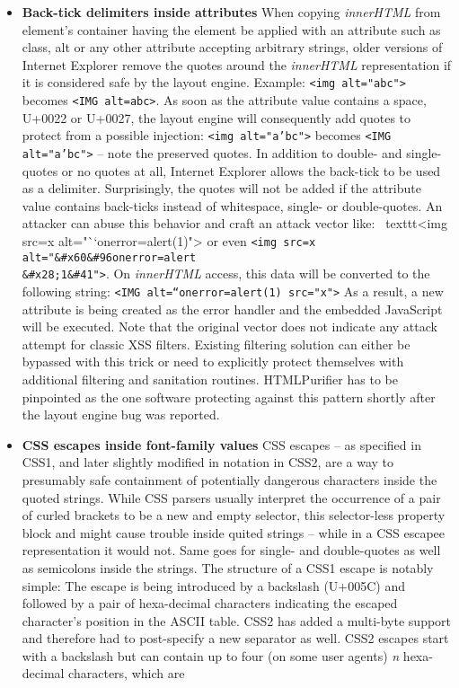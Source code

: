     \begin{itemize}
     \item \textbf{Back-tick delimiters inside attributes} When copying \textit{innerHTML} from element's container having the element be applied with an attribute such as class, alt or any other attribute accepting arbitrary strings, older versions of Internet Explorer remove the quotes around the \textit{innerHTML} representation if it is considered safe by the layout engine. Example: \texttt{<img alt="abc">} becomes \texttt{<IMG alt=abc>}. As soon as the attribute value contains a space, U+0022 or U+0027, the layout engine will consequently add quotes to protect from a possible injection: \texttt{<img alt="a'bc">} becomes \texttt{<IMG alt="a'bc">} -- note the preserved quotes. In addition to double- and single-quotes or no quotes at all, Internet Explorer allows the back-tick to be used as a delimiter. Surprisingly, the quotes will not be added if the attribute value contains back-ticks instead of whitespace, single- or double-quotes. An attacker can abuse this behavior and craft an attack vector like: \
texttt{<img src=x alt="``onerror=alert(1)">} or even \texttt{<img src=x alt="\&\#x60\&\#96onerror=alert\\
\&\#x28;1\&\#41">}. On \textit{innerHTML} access, this data will be converted to the following string: \texttt{<IMG alt=``onerror=alert(1) src="x">} As a result, a new attribute is being created as the error handler and the embedded JavaScript will be executed. Note that the original vector does not indicate any attack attempt for classic XSS filters. Existing filtering solution can either be bypassed with this trick or need to explicitly protect themselves with additional filtering and sanitation routines. HTMLPurifier has to be pinpointed as the one software protecting against this pattern shortly after the layout engine bug was reported.
     \item \textbf{CSS escapes inside font-family values} CSS escapes -- as specified in CSS1, and later slightly modified in notation in CSS2, are a way to presumably safe containment of potentially dangerous characters inside the quoted strings. While CSS parsers usually interpret the occurrence of a pair of curled brackets to be a new and empty selector, this selector-less property block and might cause trouble inside quited strings -- while in a CSS escapee representation it would not. Same goes for single- and double-quotes as well as semicolons inside the strings. The structure of a CSS1 escape is notably simple: The escape is being introduced by a backslash (U+005C) and followed by a pair of hexa-decimal characters indicating the escaped character's position in the ASCII table. CSS2 has added a multi-byte support and therefore had to post-specify a new separator as well. CSS2 escapes start with a backslash but can contain up to four (on some user agents) \textit{n} hexa-decimal characters, which are 

\end{itemize}
